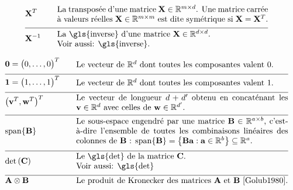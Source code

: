\begin{align}
	&\mathbf{X}^{T} &\quad & \parbox{.75\textwidth}{La transposée d’une matrice $\mathbf{X} \in \mathbb{R}^{\samplesize \times \featuredim}$. Une matrice carrée à valeurs réelles $\mathbf{X} \in \mathbb{R}^{\samplesize \times \samplesize}$ est dite symétrique si $\mathbf{X} = \mathbf{X}^{T}$.}  \nonumber \\[2mm] \hline \nonumber\\[-5mm]
	&\mathbf{X}^{-1} &\quad & \parbox{.75\textwidth}{La \gls{inverse} d'une matrice $\mathbf{X} \in \mathbb{R}^{\featuredim \times \featuredim}$.
		\\ Voir aussi: \gls{inverse}. }  \nonumber 
\end{align}

\newpage
\begin{align} 
	&\mathbf{0}= \big(0,\ldots,0\big)^{T}  & \quad &  \parbox{.75\textwidth}{Le vecteur de $\mathbb{R}^{\dimlocalmodel}$ dont toutes les composantes valent 0.} \nonumber \\[2mm] \hline \nonumber\\[-5mm]
	&\mathbf{1}= \big(1,\ldots,1\big)^{T}  & \quad &  \parbox{.75\textwidth}{Le vecteur de $\mathbb{R}^{\dimlocalmodel}$ dont toutes les composantes valent 1.} \nonumber \\[2mm] \hline \nonumber\\[-5mm]
	&\big(\vv^{T},\vw^{T} \big)^{T}  & \quad &  \parbox{.75\textwidth}{Le vecteur de longueur $\featuredim+\featuredim'$ obtenu en concaténant les $\vv \in \mathbb{R}^{\featuredim}$ avec celles de $\vw \in \mathbb{R}^{\featuredim'}$.} \nonumber \\[2mm] \hline \nonumber\\[-5mm]
	&	{\rm span}\{ \mathbf{B} \}  & \quad &  \parbox{.75\textwidth}{Le sous-espace engendré par une matrice $\mathbf{B} \in \mathbb{R}^{a \times b}$, c’est-à-dire l’ensemble de toutes les combinaisons linéaires des colonnes de $\mathbf{B}$ : ${\rm span}\{ \mathbf{B} \} = \big\{  \mathbf{B} \va : \va \in \mathbb{R}^{b} \big\} \subseteq \mathbb{R}^{a}$.} \nonumber \\[2mm] \hline \nonumber\\[-5mm]
	&\determinant{\mC} &\quad & \parbox{.75\textwidth}{Le \gls{det} de la matrice $\mC$. \\ Voir aussi: \gls{det}} \nonumber \\[2mm] \hline \nonumber\\[-5mm]
	&\mathbf{A} \otimes \mathbf{B} &\quad & \parbox{.75\textwidth}{Le produit de Kronecker des matrices $\mathbf{A}$ et $\mathbf{B}$ \cite{Golub1980}.} \nonumber
\end{align}

